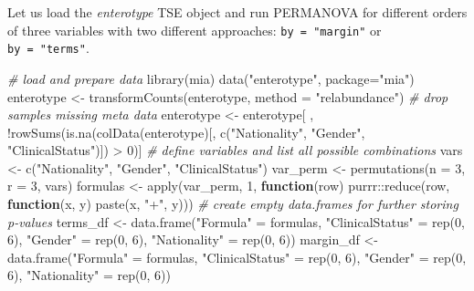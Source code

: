 \documentclass[
]{book}
\newenvironment{Shaded}{\begin{snugshade}}{\end{snugshade}}
\newcommand{\AttributeTok}[1]{\textcolor[rgb]{0.77,0.63,0.00}{#1}}
\newcommand{\CommentTok}[1]{\textcolor[rgb]{0.56,0.35,0.01}{\textit{#1}}}
\newcommand{\ControlFlowTok}[1]{\textcolor[rgb]{0.13,0.29,0.53}{\textbf{#1}}}
\newcommand{\DecValTok}[1]{\textcolor[rgb]{0.00,0.00,0.81}{#1}}
\newcommand{\FunctionTok}[1]{\textcolor[rgb]{0.00,0.00,0.00}{#1}}
\newcommand{\NormalTok}[1]{#1}
\newcommand{\OtherTok}[1]{\textcolor[rgb]{0.56,0.35,0.01}{#1}}
\newcommand{\SpecialCharTok}[1]{\textcolor[rgb]{0.00,0.00,0.00}{#1}}
\newcommand{\StringTok}[1]{\textcolor[rgb]{0.31,0.60,0.02}{#1}}
\begin{document}
Let us load the \emph{enterotype} TSE object and run PERMANOVA for
different orders of three variables with two different approaches:
\texttt{by\ =\ "margin"} or \texttt{by\ =\ "terms"}.

\begin{Shaded}
\begin{Highlighting}[]
\CommentTok{\# load and prepare data}
\FunctionTok{library}\NormalTok{(mia)}
\FunctionTok{data}\NormalTok{(}\StringTok{"enterotype"}\NormalTok{, }\AttributeTok{package=}\StringTok{"mia"}\NormalTok{)}
\NormalTok{enterotype }\OtherTok{\textless{}{-}} \FunctionTok{transformCounts}\NormalTok{(enterotype, }\AttributeTok{method =} \StringTok{"relabundance"}\NormalTok{)}
\CommentTok{\# drop samples missing meta data}
\NormalTok{enterotype }\OtherTok{\textless{}{-}}\NormalTok{ enterotype[ , }\SpecialCharTok{!}\FunctionTok{rowSums}\NormalTok{(}\FunctionTok{is.na}\NormalTok{(}\FunctionTok{colData}\NormalTok{(enterotype)[, }\FunctionTok{c}\NormalTok{(}\StringTok{"Nationality"}\NormalTok{, }\StringTok{"Gender"}\NormalTok{, }\StringTok{"ClinicalStatus"}\NormalTok{)]) }\SpecialCharTok{\textgreater{}} \DecValTok{0}\NormalTok{)]}
\CommentTok{\# define variables and list all possible combinations}
\NormalTok{vars }\OtherTok{\textless{}{-}} \FunctionTok{c}\NormalTok{(}\StringTok{"Nationality"}\NormalTok{, }\StringTok{"Gender"}\NormalTok{, }\StringTok{"ClinicalStatus"}\NormalTok{)}
\NormalTok{var\_perm }\OtherTok{\textless{}{-}} \FunctionTok{permutations}\NormalTok{(}\AttributeTok{n =} \DecValTok{3}\NormalTok{, }\AttributeTok{r =} \DecValTok{3}\NormalTok{, vars)}
\NormalTok{formulas }\OtherTok{\textless{}{-}} \FunctionTok{apply}\NormalTok{(var\_perm, }\DecValTok{1}\NormalTok{, }\ControlFlowTok{function}\NormalTok{(row) purrr}\SpecialCharTok{::}\FunctionTok{reduce}\NormalTok{(row, }\ControlFlowTok{function}\NormalTok{(x, y) }\FunctionTok{paste}\NormalTok{(x, }\StringTok{"+"}\NormalTok{, y)))}
\CommentTok{\# create empty data.frames for further storing p{-}values}
\NormalTok{terms\_df }\OtherTok{\textless{}{-}} \FunctionTok{data.frame}\NormalTok{(}\StringTok{"Formula"} \OtherTok{=}\NormalTok{ formulas,}
                       \StringTok{"ClinicalStatus"} \OtherTok{=} \FunctionTok{rep}\NormalTok{(}\DecValTok{0}\NormalTok{, }\DecValTok{6}\NormalTok{),}
                       \StringTok{"Gender"} \OtherTok{=} \FunctionTok{rep}\NormalTok{(}\DecValTok{0}\NormalTok{, }\DecValTok{6}\NormalTok{),}
                       \StringTok{"Nationality"} \OtherTok{=} \FunctionTok{rep}\NormalTok{(}\DecValTok{0}\NormalTok{, }\DecValTok{6}\NormalTok{))}
\NormalTok{margin\_df }\OtherTok{\textless{}{-}} \FunctionTok{data.frame}\NormalTok{(}\StringTok{"Formula"} \OtherTok{=}\NormalTok{ formulas,}
                        \StringTok{"ClinicalStatus"} \OtherTok{=} \FunctionTok{rep}\NormalTok{(}\DecValTok{0}\NormalTok{, }\DecValTok{6}\NormalTok{),}
                        \StringTok{"Gender"} \OtherTok{=} \FunctionTok{rep}\NormalTok{(}\DecValTok{0}\NormalTok{, }\DecValTok{6}\NormalTok{),}
                        \StringTok{"Nationality"} \OtherTok{=} \FunctionTok{rep}\NormalTok{(}\DecValTok{0}\NormalTok{, }\DecValTok{6}\NormalTok{))}
\end{Highlighting}
\end{Shaded}
\end{document}
